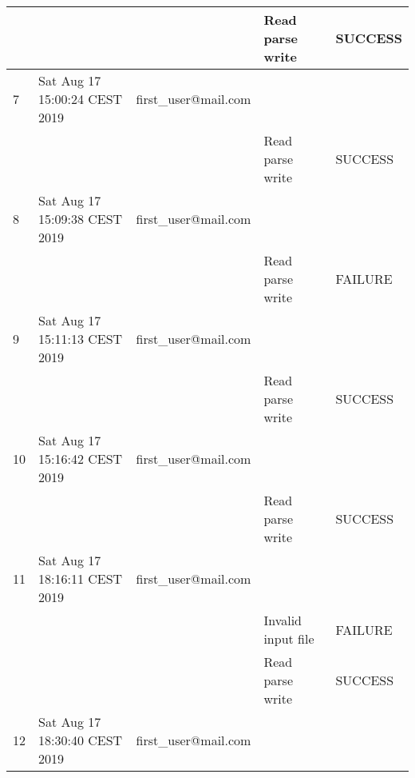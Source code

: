 \begin{table}[]
{\begin{tabular}{|l|l|l|l|l|}
    &       &                                            & Read parse write                            & SUCCESS                                \\ \hline
    7 &     Sat Aug 17 15:00:24 CEST 2019        & first\_user@mail.com            &                                             &                                        \\ \hline
    &       &                                            & Read parse write                            & SUCCESS                                \\ \hline
    8 &      Sat Aug 17 15:09:38 CEST 2019        & first\_user@mail.com            &                                             &                                        \\ \hline
    &       &                                            & Read parse write                            & FAILURE                                \\ \hline
    9 &     Sat Aug 17 15:11:13 CEST 2019        & first\_user@mail.com            &                                             &                                        \\ \hline
    &       &                                            & Read parse write                            & SUCCESS                                \\ \hline
    10 &    Sat Aug 17 15:16:42 CEST 2019        & first\_user@mail.com            &                                             &                                        \\ \hline
    &       &                                            & Read parse write                            & SUCCESS                                \\ \hline
    11 &    Sat Aug 17 18:16:11 CEST 2019        & first\_user@mail.com            &                                             &                                        \\ \hline
    &       &                                            & Invalid input file                          & FAILURE                                \\ \hline
    &       &                                            & Read parse write                            & SUCCESS                                \\ \hline
    12 &    Sat Aug 17 18:30:40 CEST 2019        & first\_user@mail.com            &                                             &                                        \\ \hline

\end{tabular}}
\end{table}
